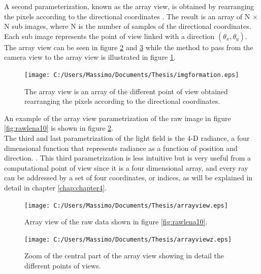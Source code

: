 A second parameterization, known as the array view, is obtained by rearranging the pixels according to the directional coordinates \cite{ng2006digital}. The result is an array of N $\times$ N sub images, where N is the number of samples of the directional coordinates. Each sub image represents the point of view linked with a direction $(\theta_x, \theta_y)$. The array view can be seen in figure \ref{fig:arrayview1} and \ref{fig:arrayview1z} while the method to pass from the camera view to the array view is illustrated in figure \ref{fig:arrayview}. \\
\begin{figure}[H]
	\centering
	\texttt{[image: C:/Users/Massimo/Documents/Thesis/imgformation.eps]}
	\caption{\label{fig:arrayview}The array view is an array of the different point of view obtained rearranging the pixels according to the directional coordinates.  }
\end{figure}
An example of the array view parametrization of the raw image in figure \ref{fig:rawlena10} is shown in figure \ref{fig:arrayview1}.\\
The third and last parametrization of the light field is the 4-D radiance, a four dimensional function that represents radiance as a function of position and direction. \cite{levoy1996light}. This third parametrization is less intuitive but is very useful from a computational point of view since it is a four dimensional array, and every ray can be addressed by a set of four coordinates, or indices, as will be explained in detail in chapter \ref{chap:chapter4}.
\newpage
\begin{figure}[H]
	\centering
	\texttt{[image: C:/Users/Massimo/Documents/Thesis/arrayview.eps]}
	\caption{\label{fig:arrayview1}Array view of the raw data shown in figure \ref{fig:rawlena10}.  }
\end{figure}
\begin{figure}[H]
	\centering
	\texttt{[image: C:/Users/Massimo/Documents/Thesis/arrayviewz.eps]}
	\caption{\label{fig:arrayview1z}Zoom of the central part of the array view showing in detail the different points of views.  }
\end{figure}
\newpage

